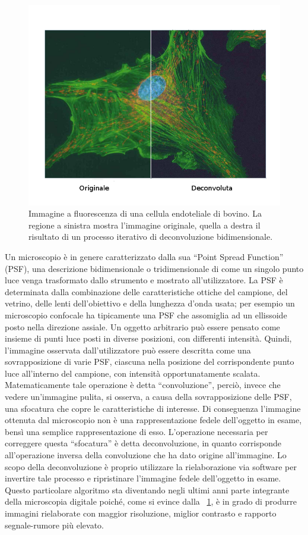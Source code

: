 \begin{figure}[h]
 \centering
 \includegraphics[scale=.60]{img/CAP2decon.png}
 \caption{\small{Immagine a fluorescenza di una cellula endoteliale di bovino. La regione a sinistra mostra l'immagine originale, quella a destra il risultato di un processo iterativo di deconvoluzione bidimensionale.}}
 \label{fig:decon}
\end{figure}

Un microscopio è in genere caratterizzato dalla sua ``Point Spread Function'' (PSF), una descrizione bidimensionale o tridimensionale di come un singolo punto luce venga trasformato dallo strumento e mostrato all'utilizzatore. 
La PSF è determinata dalla combinazione delle caratteristiche ottiche del campione, del vetrino, delle lenti dell'obiettivo e della lunghezza d'onda usata; per esempio un microscopio confocale ha tipicamente una PSF che assomiglia ad un ellissoide posto nella direzione assiale.
Un oggetto arbitrario può essere pensato come insieme di punti luce posti in diverse posizioni, con differenti intensità. 
Quindi, l'immagine osservata dall'utilizzatore può essere descritta come una sovrapposizione di varie PSF, ciascuna nella posizione del corrispondente punto luce all'interno del campione, con intensità opportunatamente scalata.
Matematicamente tale operazione è detta ``convoluzione'', perciò, invece che vedere un'immagine pulita, si osserva, a causa della sovrapposizione delle PSF, una sfocatura che copre le caratteristiche di interesse. 
Di conseguenza l'immagine ottenuta dal microscopio non è una rappresentazione fedele dell'oggetto in esame, bensì una semplice rappresentazione di esso.
L'operazione necessaria per correggere questa ``sfocatura'' è detta deconvoluzione, in quanto corrisponde all'operazione inversa della convoluzione che ha dato origine all'immagine.
Lo scopo della deconvoluzione è proprio utilizzare la rielaborazione via software per invertire tale processo e ripristinare l'immagine fedele dell'oggetto in esame. 
Questo particolare algoritmo sta diventando negli ultimi anni parte integrante della microscopia digitale poiché, come si evince dalla \figurename~\ref{fig:decon}, è in grado di produrre immagini rielaborate con maggior risoluzione, miglior contrasto e rapporto segnale-rumore più elevato.

